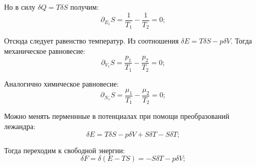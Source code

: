 \documentclass[a4paper, 14pt, russian]{article}
\newcommand{\be}{\begin{equation}}
\newcommand{\ee}{\end{equation}}
\newcommand{\pa}{\partial}
\begin{document}
	Но в силу $\delta Q = T \delta S$ получим:
	\be
		\pa_{E_1} S = \frac{1}{T_1} - \frac{1}{T_2} = 0;
	\ee

	Отсюда следует равенство температур. Из соотношения 
	$\delta E = T \delta S - p\delta V$. Тогда механическое 
	равновесие:
	\be
		\pa_{V_1}  S = \frac{p_1}{T_1}  - \frac{p_2}{T_2} = 0;
	\ee

	Аналогично химическое равновесие:
	\be
		\pa_{N_1}  S = \frac{\mu_1}{T_1}  - \frac{\mu_2}{T_2} = 0;
	\ee

	Можно менять перменнные в потенциалах при помощи 
	преобразований лежандра:
	\be
		\delta E = T \delta S - p \delta V + S \delta T - S \delta T; 
	\ee

	Тогда переходим к свободной энергии:
	\be
		\delta F  = \delta(E - TS) = - S \delta T - p \delta V;
	\ee
\end{document}
